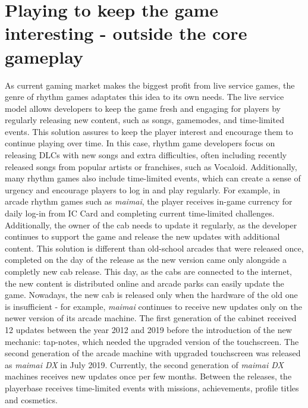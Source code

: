 \section{Playing to keep the game interesting - outside the core gameplay}
As current gaming market makes the biggest profit from live service games, the genre of rhythm games adaptates this idea to its own needs. The live service model allows developers to keep the game fresh and engaging for players by regularly releasing new content, such as songs, gamemodes, and time-limited events. This solution assures to keep the player interest and encourage them to continue playing over time. In this case, rhythm game developers focus on releasing DLCs with new songs and extra difficulties, often including recently released songs from popular artists or franchises, such as Vocaloid. Additionally, many rhythm games also include time-limited events, which can create a sense of urgency and encourage players to log in and play regularly. For example, in arcade rhythm games such as \textit{maimai}, the player receives in-game currency for daily log-in from IC Card and completing current time-limited challenges. Additionally, the owner of the cab needs to update it regularly, as the developer continues to support the game and release the new updates with additional content. This solution is different than old-school arcades that were released once, completed on the day of the release as the new version came only alongside a completly new cab release. This day, as the cabs are connected to the internet, the new content is distributed online and arcade parks can easily update the game. Nowadays, the new cab is released only when the hardware of the old one is insufficient - for example, \textit{maimai} continues to receive new updates only on the newer version of its arcade machine. The first generation of the cabinet received 12 updates between the year 2012 and 2019 before the introduction of the new mechanic: tap-notes, which needed the upgraded version of the touchscreen. The second generation of the arcade machine with upgraded touchscreen was released as \textit{maimai DX} in July 2019. Currently, the second generation of \textit{maimai DX} machines receives new updates once per few months. Between the releases, the playerbase receives time-limited events with missions, achievements, profile titles and cosmetics.

